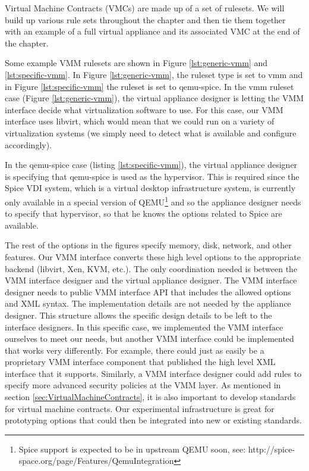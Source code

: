 Virtual Machine Contracts (VMCs) are made up of a set of rulesets. We will build up various rule sets throughout the chapter and then tie them together with an example of a full virtual appliance and its associated VMC at the end of the chapter.

Some example VMM rulesets are shown in Figure \ref{lst:generic-vmm} and \ref{lst:specific-vmm}. In Figure \ref{lst:generic-vmm}, the ruleset type is set to vmm and in Figure \ref{lst:specific-vmm} the ruleset is set to qemu-spice. In the vmm ruleset case (Figure \ref{lst:generic-vmm}), the virtual appliance designer is letting the VMM interface decide what virtualization software to use. For this case, our VMM interface uses libvirt, which would mean that we could run on a variety of virtualization systems (we simply need to detect what is available and configure accordingly). 

In the qemu-spice case (listing \ref{lst:specific-vmm}), the virtual appliance designer is specifying that qemu-spice is used as the hypervisor. This is required since the Spice VDI system, which is a virtual desktop infrastructure system, is currently only available in a special version of QEMU\footnote{Spice support is expected to be in upstream QEMU soon, see: http://spice-space.org/page/Features/QemuIntegration} and so the appliance designer needs to specify that hypervisor, so that he knows the options related to Spice are available.

The rest of the options in the figures specify memory, disk, network, and other features. Our VMM interface converts these high level options to the appropriate backend (libvirt, Xen, KVM, etc.). The only coordination needed is between the VMM interface designer and the virtual appliance designer. The VMM interface designer needs to public VMM interface API that includes the allowed options and XML syntax. The implementation details are not needed by the appliance designer. This structure allows the specific design details to be left to the interface designers. In this specific case, we implemented the VMM interface ourselves to meet our needs, but another VMM interface could be implemented that works very differently. For example, there could just as easily be a proprietary VMM interface component that published the high level XML interface that it supports. Similarly, a VMM interface designer could add rules to specify more advanced security policies at the VMM layer. As mentioned in section \ref{sec:VirtualMachineContracts}, it is also important to develop standards for virtual machine contracts. Our experimental infrastructure is great for prototyping options that could then be integrated into new or existing standards.

